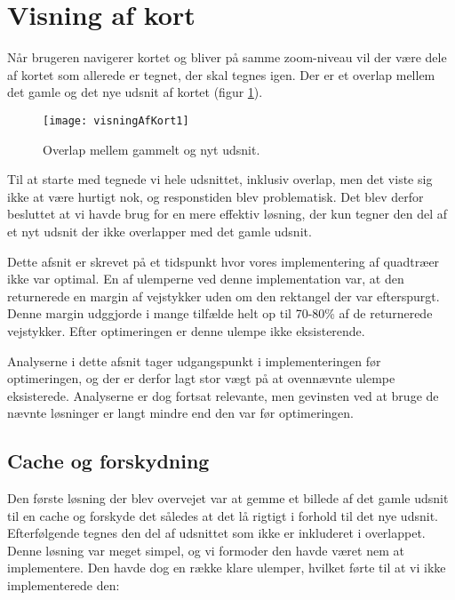 \section{Visning af kort}
\label{sec:visningAfKort}

Når brugeren navigerer kortet og bliver på samme zoom-niveau vil der være dele af kortet som allerede er tegnet, der skal tegnes igen. Der er et overlap mellem det gamle og det nye udsnit af kortet (figur \ref{figur:visningAfKort1}).

\begin{figure}[h]
	\centering
	\texttt{[image: visningAfKort1]}
	\captionsetup{width=0.8\textwidth}
	\caption{Overlap mellem gammelt og nyt udsnit.}
	\label{figur:visningAfKort1}
\end{figure}

Til at starte med tegnede vi hele udsnittet, inklusiv overlap, men det viste sig ikke at være hurtigt nok, og responstiden blev problematisk. Det blev derfor besluttet at vi havde brug for en mere effektiv løsning, der kun tegner den del af et nyt udsnit der ikke overlapper med det gamle udsnit.

Dette afsnit er skrevet på et tidspunkt hvor vores implementering af quadtræer ikke var optimal. En af ulemperne ved denne implementation var, at den returnerede en margin af vejstykker uden om den rektangel der var efterspurgt. Denne margin udggjorde i mange tilfælde helt op til 70-80\% af de returnerede vejstykker. Efter optimeringen er denne ulempe ikke eksisterende.

Analyserne i dette afsnit tager udgangspunkt i implementeringen før optimeringen, og der er derfor lagt stor vægt på at ovennævnte ulempe eksisterede. Analyserne er dog fortsat relevante, men gevinsten ved at bruge de nævnte løsninger er langt mindre end den var før optimeringen.

\subsection{Cache og forskydning}
\label{subsec:cacheOgForskydning}

Den første løsning der blev overvejet var at gemme et billede af det gamle udsnit til en cache og forskyde det således at det lå rigtigt i forhold til det nye udsnit. Efterfølgende tegnes den del af udsnittet som ikke er inkluderet i overlappet. Denne løsning var meget simpel, og vi formoder den havde været nem at implementere. Den havde dog en række klare ulemper, hvilket førte til at vi ikke implementerede den:

